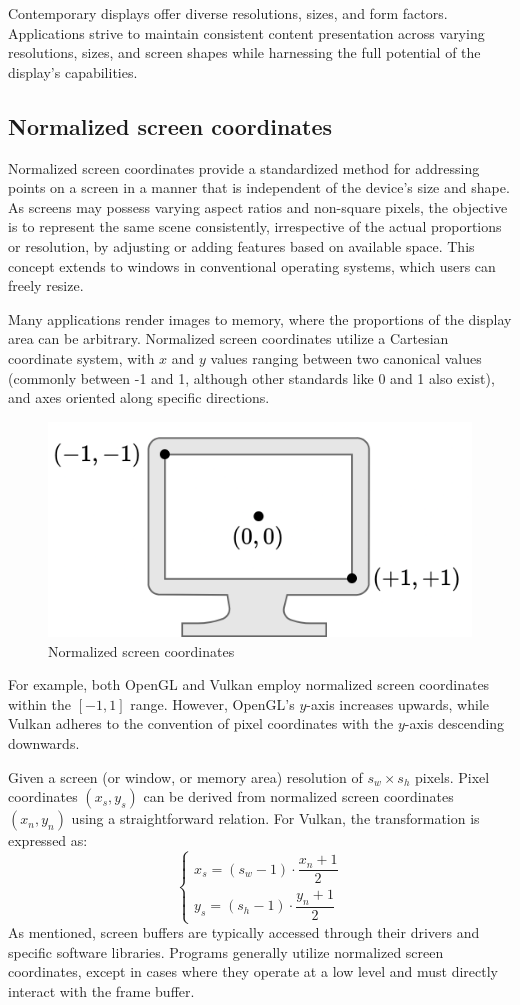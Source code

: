 Contemporary displays offer diverse resolutions, sizes, and form factors. 
Applications strive to maintain consistent content presentation across varying resolutions, sizes, and screen shapes while harnessing the full potential of the display's capabilities.

\subsection{Normalized screen coordinates}
Normalized screen coordinates provide a standardized method for addressing points on a screen in a manner that is independent of the device's size and shape. 
As screens may possess varying aspect ratios and non-square pixels, the objective is to represent the same scene consistently, irrespective of the actual proportions or resolution, by adjusting or adding features based on available space.
This concept extends to windows in conventional operating systems, which users can freely resize.

Many applications render images to memory, where the proportions of the display area can be arbitrary. 
Normalized screen coordinates utilize a Cartesian coordinate system, with $x$ and $y$ values ranging between two canonical values (commonly between -1 and 1, although other standards like 0 and 1 also exist), and axes oriented along specific directions.

\begin{figure}[H]
    \centering
    \includegraphics[width=0.5\linewidth]{images/nsc.png}
    \caption{Normalized screen coordinates}
\end{figure}
For example, both OpenGL and Vulkan employ normalized screen coordinates within the $\left[-1, 1\right]$ range.
However, OpenGL's $y$-axis increases upwards, while Vulkan adheres to the convention of pixel coordinates with the $y$-axis descending downwards.

Given a screen (or window, or memory area) resolution of $s_w \times s_h$ pixels. 
Pixel coordinates $\left(x_s,y_s\right)$ can be derived from normalized screen coordinates $\left(x_n,y_n\right)$ using a straightforward relation.
For Vulkan, the transformation is expressed as:
\[\begin{cases}
    x_s = (s_w-1) \cdot \dfrac{x_n+1}{2} \\ 
    y_s = (s_h-1) \cdot \dfrac{y_n+1}{2}
\end{cases}\]
As mentioned, screen buffers are typically accessed through their drivers and specific software libraries.
Programs generally utilize normalized screen coordinates, except in cases where they operate at a low level and must directly interact with the frame buffer.

